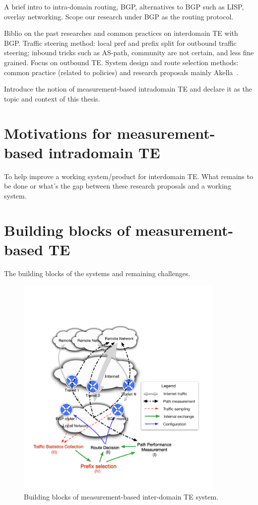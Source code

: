 A brief intro to intra-domain routing, BGP, alternatives to BGP such as LISP, overlay networking.
Scope our research under BGP as the routing protocol.

Biblio on the past researches and common practices on interdomain TE with BGP.
Traffic steering method: local pref and prefix split for outbound traffic steering; inbound tricks such as AS-path, community are not certain, and less fine grained. Focus on outbound TE.
System design and route selection methods: common practice (related to policies) and research proposals mainly Akella~\cite{Akella2008}.

Introduce the notion of measurement-based intradomain TE and declare it as the topic and context of this thesis.

\section{Motivations for measurement-based intradomain TE}
To help improve a working system/product for interdomain TE.
What remains to be done or what's the gap between these research proposals and a working system.

\section{Building blocks of measurement-based TE}
The building blocks of the systems and remaining challenges.

\begin{figure}[!htb]
\centering
\includegraphics[width=0.9\textwidth]{gfx/chap1/archi.pdf}
\caption{Building blocks of measurement-based inter-domain TE system.}
\label{fig:archi}
\end{figure}


